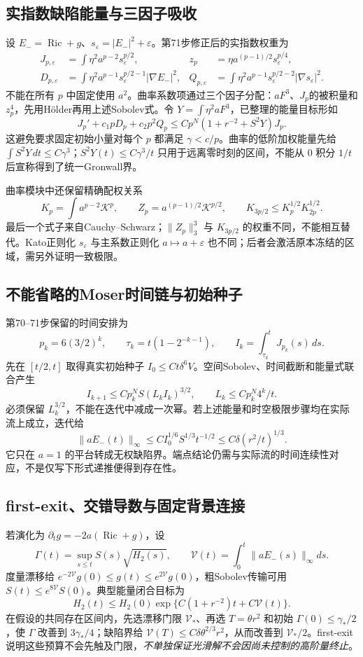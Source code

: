 \documentclass[UTF8,a4paper,11pt,fontset=fandol]{ctexart}
\numberwithin{equation}{section}
\theoremstyle{definition}
\newcommand{\Ric}{\operatorname{Ric}}
\begin{document}
\subsection{实指数缺陷能量与三因子吸收}
设 $E_-=\Ric+g$、$s_\varepsilon=|E_-|^2+\varepsilon$。第71步修正后的实指数权重为
\begin{align*}
J_{p,\varepsilon}&=\int\eta^2a^{p-2}s_\varepsilon^{p/2},
&z_p&=\eta a^{(p-1)/2}s_\varepsilon^{p/4},\\
D_{p,\varepsilon}&=\int\eta^2a^{p-1}s_\varepsilon^{p/2-1}|\nabla E_-|^2,
&Q_{p,\varepsilon}&=\int\eta^2a^{p-1}s_\varepsilon^{p/2-2}|\nabla s_\varepsilon|^2.
\end{align*}
不能在所有 $p$ 中固定使用 $a^2$。曲率系数项通过三个因子分配：$aF^3$、$J_p$的被积量和 $z_p^4$，先用H\"older再用上述Sobolev式。令 $Y=\int\eta^2aF^3$，已整理的能量目标形如
\[
J_p'+c_1pD_p+c_2p^2Q_p
\le Cp^N(1+r^{-2}+S^2Y)J_p.
\]
这避免要求固定初始小量对每个 $p$ 都满足 $\gamma<c/p$。曲率的低阶加权能量先给 $\int S^2Y\,dt\le C\gamma^3$；$S^2Y(t)\le C\gamma^3/t$ 只用于远离零时刻的区间，不能从 $0$ 积分 $1/t$ 后宣称得到了统一Gronwall界。

曲率模块中还保留精确配权关系
\[
K_p=\int a^{p-2}\mathcal K^p,\qquad Z_p=a^{(p-1)/2}\mathcal K^{p/2},
\qquad K_{3p/2}\le K_p^{1/2}K_{2p}^{1/2}.
\]
最后一个式子来自Cauchy--Schwarz；$\|Z_p\|_3^3$ 与 $K_{3p/2}$ 的权重不同，不能相互替代。Kato正则化 $s_\varepsilon$ 与主系数正则化 $a\mapsto a+\varepsilon$ 也不同；后者会激活原本冻结的区域，需另外证明一致极限。

\subsection{不能省略的Moser时间链与初始种子}
第70--71步保留的时间安排为
\[
p_k=6(3/2)^k,\qquad \tau_k=t(1-2^{-k-1}),\qquad
I_k=\int_{\tau_k}^{t}J_{p_k}(s)\,ds.
\]
先在 $[t/2,t]$ 取得真实初始种子 $I_0\le Ct\delta^6V$。空间Sobolev、时间截断和能量式联合产生
\[
I_{k+1}\le Cp_k^N S(L_kI_k)^{3/2},\qquad
L_k\le Cp_k^N4^k/t.
\]
必须保留 $L_k^{3/2}$，不能在迭代中减成一次幂。若上述能量和时空极限步骤均在实际流上成立，迭代给
\[
\|aE_-(t)\|_\infty\le C I_0^{1/6}S^{1/3}t^{-1/2}
\le C\delta(r^2/t)^{1/3}.
\]
它只在 $a=1$ 的平台转成无权缺陷界。端点结论仍需与实际流的时间连续性对应，不是仅写下形式递推便得到存在性。

\subsection{first-exit、交错导数与固定背景连接}
若演化为 $\partial_tg=-2a(\Ric+g)$，设
\[
\Gamma(t)=\sup_{s\le t}S(s)\sqrt{H_2(s)},\qquad
\mathcal V(t)=\int_0^t\|aE_-(s)\|_\infty ds.
\]
度量漂移给 $e^{-2\mathcal V}g(0)\le g(t)\le e^{2\mathcal V}g(0)$，粗Sobolev传输可用 $S(t)\le e^{8\mathcal V}S(0)$。典型能量闭合目标为
\[
H_2(t)\le H_2(0)\exp\{C(1+r^{-2})t+C\mathcal V(t)\}.
\]
在假设的共同存在区间内，先选漂移门限 $\mathcal V_*$、再选 $T=\theta r^2$ 和初始 $\Gamma(0)\le\gamma_*/2$，使 $\Gamma$ 改善到 $3\gamma_*/4$；缺陷界给 $\mathcal V(T)\le C\delta\theta^{2/3}r^2$，从而改善到 $\mathcal V_*/2$。first-exit说明这些预算不会先触及门限，\emph{不单独保证光滑解不会因尚未控制的高阶量终止}。
\end{document}
